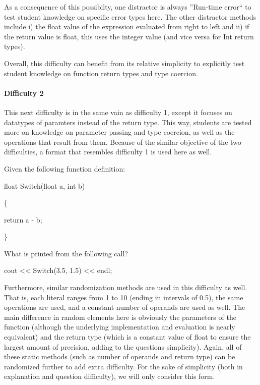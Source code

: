 \documentclass{article}
\begin{document}
As a consequence of this possibilty, one distractor is always ''Run-time error`` to test student knowledge on specific error types here. The other distractor methods include i) the float value
of the expression evaluated from right to left and ii) if the return value is float, this uses the integer value (and vice versa for Int return types).

Overall, this difficulty can benefit from its relative simplicity to explicitly test student knowledge on function return types and type coercion.

\paragraph{Difficulty 2} \hfill \par

This next difficulty is in the same vain as difficulty 1, except it focuses on datatypes of paramters instead of the return type. This way, students are tested more on knowledge on parameter passing and type coercion, as well as the operations that result from them.
Because of the similar objective of the two difficulties, a format that resembles difficulty 1 is used here as well. 

\hfill \par
Given the following function definition:\par
float Switch(float a, int b)\par
\{\par
    return a - b;\par
\}\par
What is printed from the following call?\par
cout << Switch(3.5, 1.5) << endl;\par
\hfill \par

Furthermore, similar randomization methods are used in this difficulty as well. That is, each literal ranges from 1 to 10 (ending in intervals of 0.5), the same operations are used, and a constant number of operands are used as well. The main difference in random elements here 
is obviously the parameters of the function (although the underlying implementation and evaluation is nearly equivalent) and the return type (which is a constant value of float to ensure the largest amount of precision, adding to the questions simplicity). Again, all of these static methods (such as number of operands and return type) can be randomized further to add extra difficulty. For the sake of simplicity (both in explanation and question difficulty), we will only consider this form.
\end{document}
